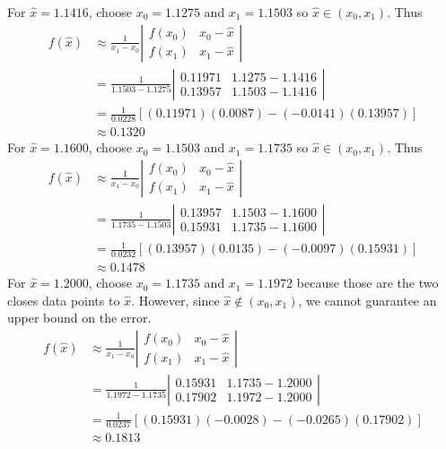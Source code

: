 \documentclass[12pt]{article}
\begin{document}
\noindent For $\hat{x} = 1.1416$, choose $x_0 = 1.1275$ and $x_1 = 1.1503$ so $\hat{x} \in (x_0, x_1)$.  Thus
\begin{align*}
f(\hat{x}) &\approx \frac{1}{x_1 - x_0}\left|\begin{array}{cc}
	f(x_0) & x_0 - \hat{x} \\
	f(x_1) & x_1 - \hat{x}
	\end{array}\right| \\
&= \frac{1}{1.1503 - 1.1275}\left|\begin{array}{cc}
	0.11971 & 1.1275 - 1.1416 \\
	0.13957 & 1.1503 - 1.1416
	\end{array}\right| \\
&= \frac{1}{0.0228}[(0.11971)(0.0087) - (-0.0141)(0.13957)] \\
&\approx \boxed{0.1320}
\end{align*}
For $\hat{x} = 1.1600$, choose $x_0 = 1.1503$ and $x_1 = 1.1735$ so $\hat{x} \in (x_0, x_1)$.  Thus
\begin{align*}
f(\hat{x}) &\approx \frac{1}{x_1 - x_0}\left|\begin{array}{cc}
	f(x_0) & x_0 - \hat{x} \\
	f(x_1) & x_1 - \hat{x}
	\end{array}\right| \\
&= \frac{1}{1.1735 - 1.1503}\left|\begin{array}{cc}
	0.13957 & 1.1503 - 1.1600 \\
	0.15931 & 1.1735 - 1.1600
	\end{array}\right| \\
&= \frac{1}{0.0232}[(0.13957)(0.0135) - (-0.0097)(0.15931)] \\
&\approx \boxed{0.1478}
\end{align*}
For $\hat{x} = 1.2000$, choose $x_0 = 1.1735$ and $x_1 = 1.1972$ because those are the two closes data points to $\hat{x}$.  However, since $\hat{x} \notin (x_0, x_1)$, we cannot guarantee an upper bound on the error.
\begin{align*}
f(\hat{x}) &\approx \frac{1}{x_1 - x_0}\left|\begin{array}{cc}
	f(x_0) & x_0 - \hat{x} \\
	f(x_1) & x_1 - \hat{x}
	\end{array}\right| \\
&= \frac{1}{1.1972 - 1.1735}\left|\begin{array}{cc}
	0.15931 & 1.1735 - 1.2000 \\
	0.17902 & 1.1972 - 1.2000
	\end{array}\right| \\
&= \frac{1}{0.0237}[(0.15931)(-0.0028) - (-0.0265)(0.17902)] \\
&\approx \boxed{0.1813}
\end{align*}
\end{document}
